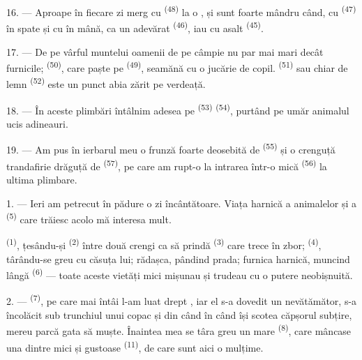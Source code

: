 \VUsaut{3.0mm}

16. --- Aproape în fiecare zi merg cu  \textsuperscript{(48)} la o
, și sunt foarte mândru când, cu 
\textsuperscript{(47)} în spate și cu  în mână, ca un adevărat
 \textsuperscript{(46)}, iau cu asalt 
\textsuperscript{(45)}.

17. --- De pe vârful muntelui oamenii de pe câmpie nu par mai mari decât furnicile;
 \textsuperscript{(50)}, care paște pe 
\textsuperscript{(49)}, seamănă cu o jucărie de copil. 
\textsuperscript{(51)} sau chiar  de lemn \textsuperscript{(52)}
este un punct abia zărit pe verdeață.

18. --- În aceste plimbări întâlnim adesea pe 
\textsuperscript{(53)}  \textsuperscript{(54)},
purtând pe umăr animalul ucis adineauri.

19. --- Am pus în ierbarul meu o frunză foarte deosebită de 
\textsuperscript{(55)} și o crenguță trandafirie drăguță de  \textsuperscript{(57)}, pe care am rupt-o la intrarea într-o 
mică \textsuperscript{(56)} la ultima plimbare.

\VUsaut{3.0mm}
\VUsaut{3.0mm}

\VUsaut{3.0mm}

1. --- Ieri am petrecut în pădure o zi încântătoare. Viața harnică a animalelor și
a  \textsuperscript{(5)} care trăiesc acolo mă interesa mult.

 \textsuperscript{(1)}, țesându-și 
\textsuperscript{(2)} între două crengi ca să prindă 
\textsuperscript{(3)} care trece în zbor;  \textsuperscript{(4)},
târându-se greu cu căsuța lui; rădașca, pândind prada; furnica harnică, muncind
lângă  \textsuperscript{(6)} --- toate aceste vietăți mici mișunau
și trudeau cu o putere neobișnuită.

2. ---  \textsuperscript{(7)}, pe care mai întâi l-am luat drept
, iar el s-a dovedit un  nevătămător, s-a
încolăcit sub trunchiul unui copac și din când în când își scotea căpșorul subțire,
mereu parcă gata să muște. Înaintea mea se târa greu un  mare
\textsuperscript{(8)}, care mâncase una dintre  mici și gustoase
\textsuperscript{(11)}, de care sunt aici o mulțime.

